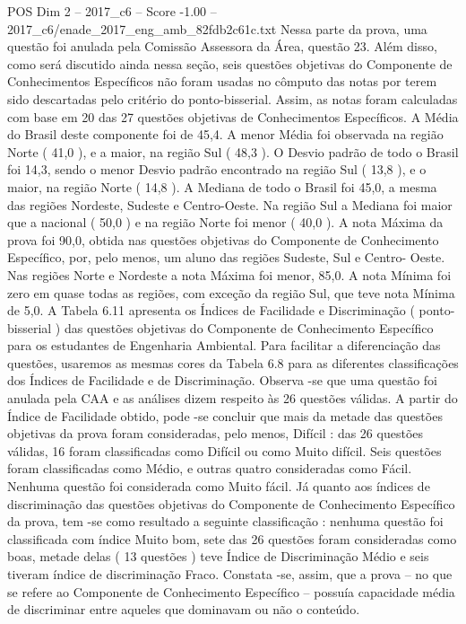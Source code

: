\begin{textsample}{POS Dim 2 – 2017\_c6 – Score -1.00 – 2017\_c6/enade\_2017\_eng\_amb\_82fdb2c61c.txt}
Nessa parte da prova, uma questão foi anulada pela Comissão Assessora da Área, questão 23.
Além disso, como será discutido ainda nessa seção, seis questões objetivas do Componente de Conhecimentos Específicos não foram usadas no cômputo das notas por terem sido descartadas pelo critério do ponto-bisserial.
Assim, as notas foram calculadas com base em 20 das 27 questões objetivas de Conhecimentos Específicos.
A Média do Brasil deste componente foi de 45,4.
A menor Média foi observada na região Norte ( 41,0 ), e a maior, na região Sul ( 48,3 ).
O Desvio padrão de todo o Brasil foi 14,3, sendo o menor Desvio padrão encontrado na região Sul ( 13,8 ), e o maior, na região Norte ( 14,8 ).
A Mediana de todo o Brasil foi 45,0, a mesma das regiões Nordeste, Sudeste e Centro-Oeste.
Na região Sul a Mediana foi maior que a nacional ( 50,0 ) e na região Norte foi menor ( 40,0 ).
A nota Máxima da prova foi 90,0, obtida nas questões objetivas do Componente de Conhecimento Específico, por, pelo menos, um aluno das regiões Sudeste, Sul e Centro- Oeste.
Nas regiões Norte e Nordeste a nota Máxima foi menor, 85,0.
A nota Mínima foi zero em quase todas as regiões, com exceção da região Sul, que teve nota Mínima de 5,0.
A Tabela 6.11 apresenta os Índices de Facilidade e Discriminação ( ponto-bisserial ) das questões objetivas do Componente de Conhecimento Específico para os estudantes de Engenharia Ambiental.
Para facilitar a diferenciação das questões, usaremos as mesmas cores da Tabela 6.8 para as diferentes classificações dos Índices de Facilidade e de Discriminação.
Observa -se que uma questão foi anulada pela CAA e as análises dizem respeito às 26 questões válidas.
A partir do Índice de Facilidade obtido, pode -se concluir que mais da metade das questões objetivas da prova foram consideradas, pelo menos, Difícil : das 26 questões válidas, 16 foram classificadas como Difícil ou como Muito difícil.
Seis questões foram classificadas como Médio, e outras quatro consideradas como Fácil.
Nenhuma questão foi considerada como Muito fácil.
Já quanto aos índices de discriminação das questões objetivas do Componente de Conhecimento Específico da prova, tem -se como resultado a seguinte classificação : nenhuma questão foi classificada com índice Muito bom, sete das 26 questões foram consideradas como boas, metade delas ( 13 questões ) teve Índice de Discriminação Médio e seis tiveram índice de discriminação Fraco.
Constata -se, assim, que a prova – no que se refere ao Componente de Conhecimento Específico – possuía capacidade média de discriminar entre aqueles que dominavam ou não o conteúdo.

\end{textsample}
